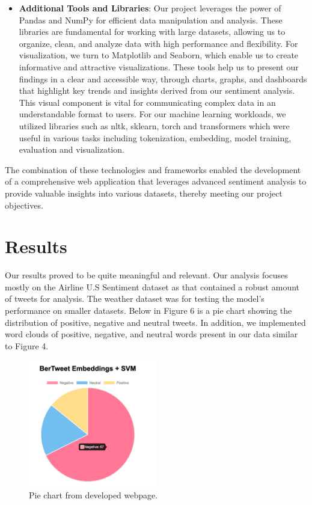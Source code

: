 \documentclass[conference]{IEEEtran}
\begin{document}
\begin{itemize}
    \item \textbf{Additional Tools and Libraries}: Our project leverages the power of Pandas and NumPy for efficient data manipulation and analysis. These libraries are fundamental for working with large datasets, allowing us to organize, clean, and analyze data with high performance and flexibility. For visualization, we turn to Matplotlib and Seaborn, which enable us to create informative and attractive visualizations. These tools help us to present our findings in a clear and accessible way, through charts, graphs, and dashboards that highlight key trends and insights derived from our sentiment analysis. This visual component is vital for communicating complex data in an understandable format to users. For our machine learning workloads, we utilized libraries such as nltk, sklearn, torch and transformers which were useful in various tasks including tokenization, embedding, model training, evaluation and visualization\cite{b20}\cite{b21}\cite{b25}.
\end{itemize}
The combination of these technologies and frameworks enabled  the development of a comprehensive web application that leverages advanced sentiment analysis to provide valuable insights into various datasets, thereby meeting our project objectives.

\section{Results}
Our results proved to be quite meaningful and relevant. Our analysis focuses mostly on the Airline U.S Sentiment dataset as that contained a robust amount of tweets for analysis. The weather dataset was for testing the model's performance on smaller datasets. Below in Figure 6 is a pie chart showing the distribution of positive, negative and neutral tweets. In addition, we implemented word clouds of positive, negative, and neutral words present in our data similar to Figure 4.
\begin{figure}[h!]
    \includegraphics[width=0.5\textwidth]{pie_chart.png}
    \caption{Pie chart from developed webpage.}
\end{figure}
\end{document}
